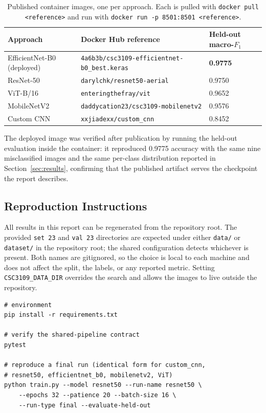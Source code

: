 \documentclass[11pt,twoside,a4paper]{article}
\begin{document}
\begin{table}[H]
\centering
\caption{Published container images, one per approach. Each is pulled with
\texttt{docker pull <reference>} and run with
\texttt{docker run -p 8501:8501 <reference>}.}
\label{tab:appendix-images}
\small
\begin{tabular}{@{}lll@{}}
\toprule
Approach & Docker Hub reference & Held-out macro-$F_1$ \\
\midrule
EfficientNet-B0 (deployed) & \texttt{4a6b3b/csc3109-efficientnet-b0\_best.keras} & \textbf{0.9775} \\
ResNet-50        & \texttt{darylchk/resnet50-aerial}          & 0.9750 \\
ViT-B/16         & \texttt{enteringthefray/vit}               & 0.9652 \\
MobileNetV2      & \texttt{daddycation23/csc3109-mobilenetv2} & 0.9576 \\
Custom CNN       & \texttt{xxjiadexx/custom\_cnn}             & 0.8452 \\
\bottomrule
\end{tabular}
\end{table}

The deployed image was verified after publication by running the held-out
evaluation inside the container: it reproduced 0.9775 accuracy with the same
nine misclassified images and the same per-class distribution reported in
Section~\ref{sec:results}, confirming that the published artifact serves the
checkpoint the report describes.

\subsection{Reproduction Instructions}

All results in this report can be regenerated from the repository root.
The provided \texttt{set 23} and \texttt{val 23} directories are expected under
either \texttt{data/} or \texttt{dataset/} in the repository root; the shared
configuration detects whichever is present. Both names are gitignored, so the
choice is local to each machine and does not affect the split, the labels, or
any reported metric. Setting \texttt{CSC3109\_DATA\_DIR} overrides the search
and allows the images to live outside the repository.

\begin{verbatim}
# environment
pip install -r requirements.txt

# verify the shared-pipeline contract
pytest

# reproduce a final run (identical form for custom_cnn,
# resnet50, efficientnet_b0, mobilenetv2, ViT)
python train.py --model resnet50 --run-name resnet50 \
    --epochs 32 --patience 20 --batch-size 16 \
    --run-type final --evaluate-held-out
\end{verbatim}
\end{document}
